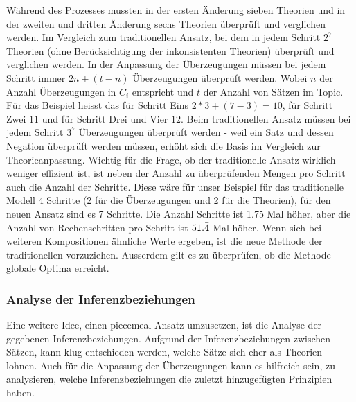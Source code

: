 \documentclass{article}
\begin{document}
 Während des Prozesses mussten in der ersten Änderung sieben Theorien und in der zweiten und dritten Änderung sechs Theorien überprüft und verglichen werden.  Im Vergleich zum traditionellen Ansatz, bei dem in jedem Schritt $2^7$ Theorien (ohne Berücksichtigung der inkonsistenten Theorien) überprüft und verglichen werden. In der Anpassung der Überzeugungen müssen bei jedem Schritt immer $2n + (t-n)$ Überzeugungen überprüft werden. Wobei $n$ der Anzahl Überzeugungen in $C_i$ entspricht und $t$ der Anzahl von Sätzen im Topic. Für das Beispiel heisst das für Schritt Eins $2*3 + (7-3) = 10$, für Schritt Zwei $11$ und für Schritt Drei und Vier $12$. Beim traditionellen Ansatz müssen bei jedem Schritt $3^7$ Überzeugungen überprüft werden - weil ein Satz und dessen Negation überprüft werden müssen, erhöht sich die Basis im Vergleich zur Theorieanpassung. Wichtig für die Frage, ob der traditionelle Ansatz wirklich weniger effizient ist, ist neben der Anzahl zu überprüfenden Mengen pro Schritt auch die Anzahl der Schritte. Diese wäre für unser Beispiel für das traditionelle Modell 4 Schritte (2 für die Überzeugungen und 2 für die Theorien), für den neuen Ansatz sind es 7 Schritte. Die Anzahl Schritte ist 1.75 Mal höher, aber die Anzahl von Rechenschritten pro Schritt ist $51.\Bar{4}$ Mal höher. Wenn sich bei weiteren Kompositionen ähnliche Werte ergeben, ist die neue Methode der traditionellen vorzuziehen. Ausserdem gilt es zu überprüfen, ob die Methode globale Optima erreicht.

\subsubsection{Analyse der Inferenzbeziehungen}
Eine weitere Idee, einen piecemeal-Ansatz umzusetzen, ist die Analyse der gegebenen Inferenzbeziehungen. Aufgrund der Inferenzbeziehungen zwischen Sätzen, kann klug entschieden werden, welche Sätze sich eher als Theorien lohnen. Auch für die Anpassung der Überzeugungen kann es hilfreich sein, zu analysieren, welche Inferenzbeziehungen die zuletzt hinzugefügten Prinzipien haben.
\end{document}
